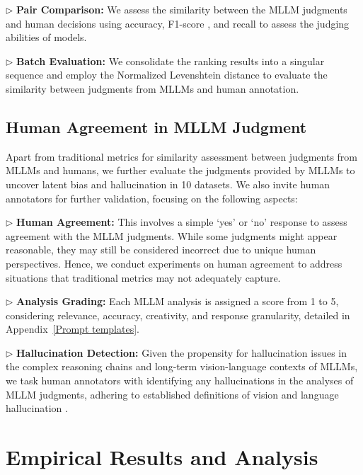     $\triangleright$ \textbf{Pair Comparison:} We assess the similarity between the MLLM judgments and human decisions using accuracy, F1-score \citep{goutte2005probabilistic}, and recall \citep{goutte2005probabilistic} to assess the judging abilities of models.
    
    $\triangleright$ \textbf{Batch Evaluation:} We consolidate the ranking results into a singular sequence and employ the Normalized Levenshtein distance \citep{levenshtein1966binary} to evaluate the similarity between judgments from MLLMs and human annotation.

 \subsection{Human Agreement in MLLM Judgment}
Apart from traditional metrics for similarity assessment between judgments from MLLMs and humans, we further evaluate the judgments provided by MLLMs to uncover latent bias and hallucination in 10 datasets. We also invite human annotators for further validation, focusing on the following aspects:

    $\triangleright$ \textbf{Human Agreement:} This involves a simple `yes' or `no' response to assess agreement with the MLLM judgments. While some judgments might appear reasonable, they may still be considered incorrect due to unique human perspectives. Hence, we conduct experiments on human agreement to address situations that traditional metrics may not adequately capture.
    
    $\triangleright$ \textbf{Analysis Grading:} Each MLLM analysis is assigned a score from 1 to 5, considering relevance, accuracy, creativity, and response granularity, detailed in Appendix~\ref{Prompt templates}.
    
    $\triangleright$ \textbf{Hallucination Detection:} Given the propensity for hallucination issues in the complex reasoning chains and long-term vision-language contexts of MLLMs, we task human annotators with identifying any hallucinations in the analyses of MLLM judgments, adhering to established definitions of vision and language hallucination \citep{sun2024trustllm}.
    
\section{Empirical Results and Analysis}


